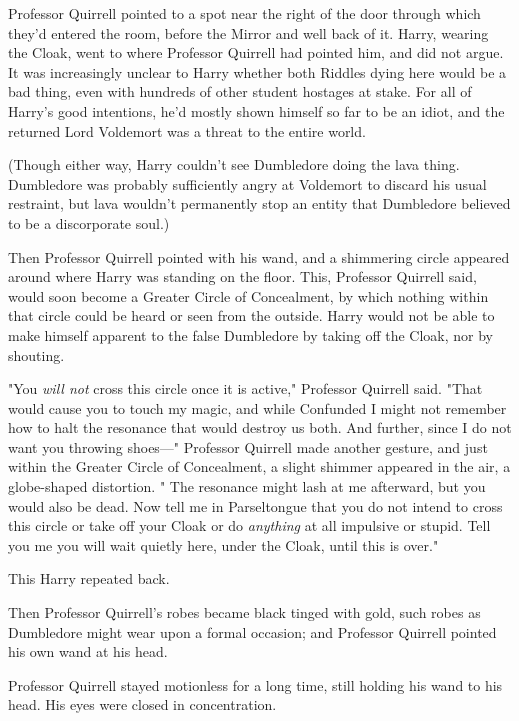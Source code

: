 Professor Quirrell pointed to a spot near the right of the door through which
they'd entered the room, before the Mirror and well back of it. Harry, wearing
the Cloak, went to where Professor Quirrell had pointed him, and did not argue.
It was increasingly unclear to Harry whether both Riddles dying here would be a
bad thing, even with hundreds of other student hostages at stake. For all of
Harry's good intentions, he'd mostly shown himself so far to be an idiot, and
the returned Lord Voldemort was a threat to the entire world.

(Though either way, Harry couldn't see Dumbledore doing the lava thing.
Dumbledore was probably sufficiently angry at Voldemort to discard his usual
restraint, but lava wouldn't permanently stop an entity that Dumbledore
believed to be a discorporate soul.)

Then Professor Quirrell pointed with his wand, and a shimmering circle appeared
around where Harry was standing on the floor. This, Professor Quirrell said,
would soon become a Greater Circle of Concealment, by which nothing within that
circle could be heard or seen from the outside. Harry would not be able to make
himself apparent to the false Dumbledore by taking off the Cloak, nor by
shouting.

"You \emph{will not} cross this circle once it is active," Professor Quirrell
said. "That would cause you to touch my magic, and while Confunded I might not
remember how to halt the resonance that would destroy us both. And further,
since I do not want you throwing shoes—" Professor Quirrell made another
gesture, and just within the Greater Circle of Concealment, a slight shimmer
appeared in the air, a globe-shaped distortion. " The resonance might lash
at me afterward, but you would also be dead. Now tell me in Parseltongue that
you do not intend to cross this circle or take off your Cloak or do
\emph{anything} at all impulsive or stupid. Tell you me you will wait quietly
here, under the Cloak, until this is over."

This Harry repeated back.

Then Professor Quirrell's robes became black tinged with gold, such robes as
Dumbledore might wear upon a formal occasion; and Professor Quirrell pointed
his own wand at his head.

Professor Quirrell stayed motionless for a long time, still holding his wand to
his head. His eyes were closed in concentration.

